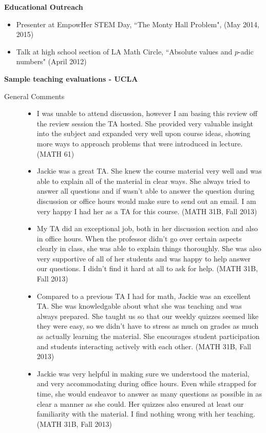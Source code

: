 \documentclass[11pt]{article}
\theoremstyle{plain} \numberwithin{equation}{section}
\theoremstyle{definition}
\begin{document}
\medskip

{\large\textbf{Educational Outreach}} \medskip

\begin{itemize} 
\item Presenter at EmpowHer STEM Day, ``The Monty Hall Problem", (May 2014, 2015)
\item Talk at high school section of LA Math Circle, ``Absolute values and $p$-adic numbers" (April 2012)
\end{itemize}

\medskip

{\large{\textbf{Sample teaching evaluations - UCLA}}
 \begin{description}

    \item[\normalsize{General Comments}] 
    	\begin{itemize}
		\item I was unable to attend discussion, however I am basing this review off the review session the TA hosted.  She provided very valuable insight into the subject and expanded very well upon course ideas, showing more ways to approach problems that were introduced in lecture.  (MATH 61)
		\item Jackie was a great TA.  She knew the course material very well and was able to explain all of the material in clear ways.  She always tried to answer all questions and if wasn't able to answer the question during discussion or office hours would make sure to send out an email.  I am very happy I had her as a TA for this course. (MATH 31B, Fall 2013)
		\item My TA did an exceptional job, both in her discussion section and also in office hours.  When the professor didn't go over certain aspects clearly in class, she was able to explain things thoroughly.  She was also very supportive of all of her students and was happy to help answer our questions.  I didn't find it hard at all to ask for help.  (MATH 31B, Fall 2013)
		\item Compared to a previous TA I had for math, Jackie was an excellent TA.  She was knowledgable about what she was teaching and was always prepared.  She taught us so that our weekly quizzes seemed like they were easy, so we didn't have to stress as much on grades as much as actually learning the material.  She encourages student participation and students interacting actively with each other.  (MATH 31B, Fall 2013)
		\item Jackie was very helpful in making sure we understood the material, and very accommodating during office hours.  Even while strapped for time, she would endeavor to answer as many questions as possible in as clear a manner as she could.  Her quizzes also ensured at least our familiarity with the material.  I find nothing wrong with her teaching.  (MATH 31B,  Fall 2013)

\end{itemize}
\end{description}}
\end{document}
